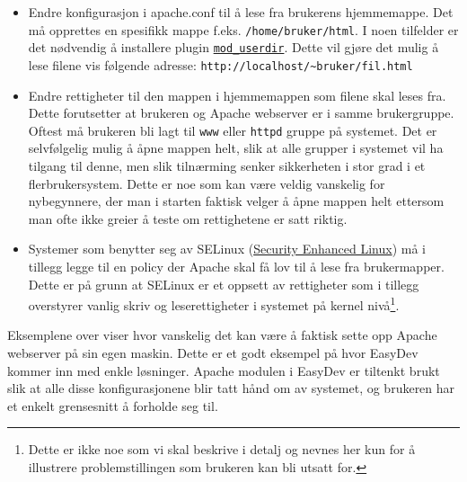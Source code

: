 \begin{itemize}
\item Endre konfigurasjon i apache.conf til å lese fra brukerens hjemmemappe. Det må opprettes en spesifikk mappe f.eks. \texttt{/home/bruker/html}. 
I noen tilfelder er det nødvendig å installere plugin \href{http://httpd.apache.org/docs/2.2/mod/mod_userdir.html}{\texttt{mod\_{}userdir}}. Dette vil gjøre det mulig å lese filene vis følgende adresse: \texttt{http://localhost/\~{}bruker/fil.html}

\item Endre rettigheter til den mappen i hjemmemappen som filene skal leses fra. Dette forutsetter at brukeren og Apache webserver er i samme brukergruppe. Oftest må brukeren bli lagt til \texttt{www} eller \texttt{httpd} gruppe på systemet. Det er selvfølgelig mulig å åpne mappen helt, slik at alle grupper i systemet vil ha tilgang til denne, men slik tilnærming senker sikkerheten i stor grad i et flerbrukersystem. Dette er noe som kan være veldig vanskelig for nybegynnere, der man i starten faktisk velger å åpne mappen helt ettersom man ofte ikke greier å teste om rettighetene er satt riktig.

\item Systemer som benytter seg av SELinux (\href{http://en.wikipedia.org/wiki/Security-Enhanced_Linux}{Security Enhanced Linux}) må i tillegg legge til en policy der Apache skal få lov til å lese fra brukermapper. Dette er på grunn at SELinux er et oppsett av rettigheter som i tillegg overstyrer vanlig skriv og leserettigheter i systemet på kernel nivå\footnote{Dette er ikke noe som vi skal beskrive i detalj og nevnes her kun for å illustrere problemstillingen som brukeren kan bli utsatt for.}. 
\end{itemize}

Eksemplene over viser hvor vanskelig det kan være å faktisk sette opp Apache webserver på sin egen maskin.  
Dette er et godt eksempel på hvor EasyDev kommer inn med enkle løsninger. Apache modulen i EasyDev er tiltenkt brukt slik at alle disse konfigurasjonene blir tatt hånd om av systemet, og brukeren har et enkelt grensesnitt å forholde seg til.


